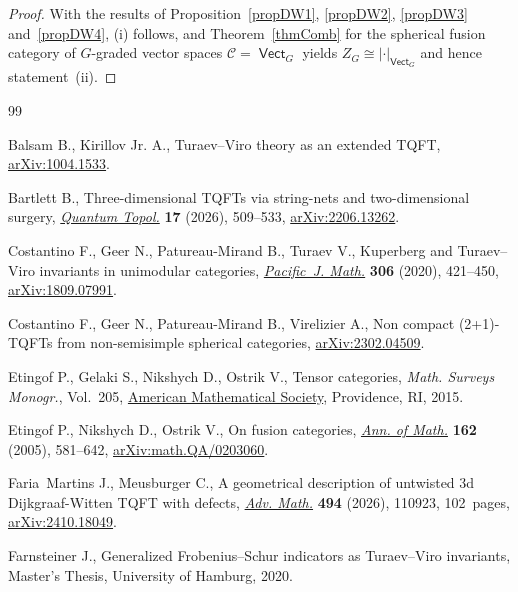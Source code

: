 \documentclass[10pt,a4paper]{amsart}
\DeclareMathOperator{\vect}{\mathsf{Vect}}
\numberwithin{equation}{section}
\theoremstyle{definition}
\begin{document}
\begin{proof}
 With the results of Proposition~\ref{propDW1}, \ref{propDW2}, \ref{propDW3} and~\ref{propDW4}, (i) follows, and Theorem~\ref{thmComb} for the spherical fusion category of $G$-graded vector spaces $\mathcal{C} = \vect_G$ yields $Z_G \cong |\cdot|_{\vect_G}$ and hence statement~(ii).
\end{proof}

\begin{thebibliography}{99}
\footnotesize\itemsep=0pt

Balsam B., Kirillov Jr. A., Turaev--{V}iro theory as an extended {TQFT},
 \href{http://arxiv.org/abs/1004.1533}{arXiv:1004.1533}.

Bartlett B., Three-dimensional {TQFT}s via string-nets and two-dimensional
 surgery, \href{https://doi.org/10.4171/qt/260}{\textit{Quantum Topol.}}
 \textbf{17} (2026), 509--533,
 \href{http://arxiv.org/abs/2206.13262}{arXiv:2206.13262}.

Costantino F., Geer N., Patureau-Mirand B., Turaev V., Kuperberg and
 {T}uraev--{V}iro invariants in unimodular categories,
 \href{https://doi.org/10.2140/pjm.2020.306.421}{\textit{Pacific~J. Math.}}
 \textbf{306} (2020), 421--450,
 \href{http://arxiv.org/abs/1809.07991}{arXiv:1809.07991}.

Costantino F., Geer N., Patureau-Mirand B., Virelizier A., Non compact
 (2+1)-{TQFT}s from non-semisimple spherical categories,
 \href{http://arxiv.org/abs/2302.04509}{arXiv:2302.04509}.

Etingof P., Gelaki S., Nikshych D., Ostrik V., Tensor categories, \textit{Math.
 Surveys Monogr.}, Vol.~205, \href{https://doi.org/10.1090/surv/205}{American
 Mathematical Society}, Providence, RI, 2015.

Etingof P., Nikshych D., Ostrik V., On fusion categories,
 \href{https://doi.org/10.4007/annals.2005.162.581}{\textit{Ann. of Math.}}
 \textbf{162} (2005), 581--642,
 \href{http://arxiv.org/abs/math.QA/0203060}{arXiv:math.QA/0203060}.

Faria~Martins J., Meusburger C., A geometrical description of untwisted 3d
 {D}ijkgraaf-{W}itten {TQFT} with defects,
 \href{https://doi.org/10.1016/j.aim.2026.110923}{\textit{Adv. Math.}}
 \textbf{494} (2026), 110923, 102~pages,
 \href{http://arxiv.org/abs/2410.18049}{arXiv:2410.18049}.

Farnsteiner J., Generalized {F}robenius--{S}chur indicators as {T}uraev--{V}iro
 invariants, {M}aster's {T}hesis, University of Hamburg, 2020.


\end{thebibliography}
\end{document}
